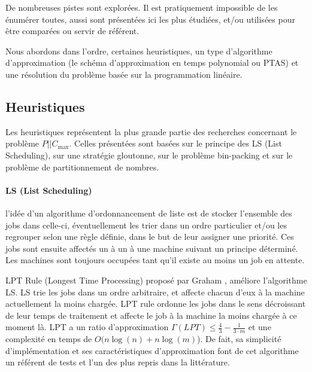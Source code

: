 \documentclass[a4paper,12pt]{report}
\theoremstyle{plain}				%
\theoremstyle{definition}				%
\newcommand\problemGrahamP{$P||C_{\max}$\xspace}
\newcommand{\lp}[1]{\todo[author=LP,color=yellow,inline]{#1}}
\begin{document}
  \lp{Pour la suite préciser: ``Pour P||Cmax'' ?}
De nombreuses pistes sont explorées. Il est pratiquement impossible de les énumérer toutes, 
  aussi sont présentées ici les plus étudiées, 
  et/ou utilisées pour être comparées ou servir de référent.
  
Nous abordons dans l'ordre, certaines heuristiques, un type d'algorithme d'approximation (le schéma d'approximation en temps polynomial ou PTAS) et une résolution du problème basée sur la programmation linéaire.

\subsection{Heuristiques}\label{ssec:Heuristiques}

Les heuristiques représentent la plus grande partie des recherches concernant le problème \problemGrahamP. 
Celles présentées sont basées 
  sur le principe des LS (List Scheduling), 
  sur une stratégie gloutonne,   
  sur le problème bin-packing et  
  sur le problème de partitionnement de nombres. 

\bigskip   
\paragraph{LS (List Scheduling)}
l'idée d'un algorithme d'ordonnancement de liste est de stocker l'ensemble des jobs dans celle-ci, éventuellement les trier dans un ordre particulier et/ou les regrouper selon une règle définie, dans le but de leur assigner une priorité. Ces jobs sont ensuite affectés un à un à une machine suivant un principe déterminé. 
Les machines sont toujours occupées tant qu'il existe au moins un job en attente.


LPT Rule (Longest Time Processing) %
  proposé par Graham \cite{graham1966bounds}, 
  améliore l'algorithme LS. LS trie les jobs dans un ordre arbitraire, 
  et affecte chacun d'eux à la machine actuellement la moins chargée. 
  LPT rule ordonne les jobs dans le sens décroissant de leur temps de traitement et affecte le job à la machine la moins chargée à ce moment là. 
LPT a 
  un ratio d'approximation $\Gamma(LPT) \leq \frac{4}{3}-\frac{1}{3 \cdot m}$ et 
  une complexité en temps de $ O(n \log(n) + n \log(m)$).
De fait, sa simplicité d'implémentation et ses caractéristiques d'approximation font 
  de cet algorithme un référent de tests et l'un des plus repris dans la littérature.
  
\end{document}
